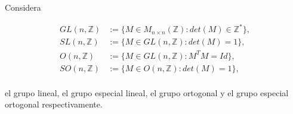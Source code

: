\question Considera 

\begin{align*}
GL(n,\mathbb{Z}) &:= \{M \in M_{n\times n}(\mathbb{Z}): det(M)\in\mathbb{Z}^*\}, \\
SL(n,\mathbb{Z}) &:= \{M \in GL(n,\mathbb{Z}): det(M)=1\}, \\
O(n,\mathbb{Z}) &:= \{M \in GL(n,\mathbb{Z}): M^TM=Id\}, \\
SO(n,\mathbb{Z}) &:= \{M \in O(n,\mathbb{Z}): det(M)=1\}, \\
\end{align*}

el grupo lineal, el grupo especial lineal, el grupo ortogonal y 
el grupo especial ortogonal respectivamente.

